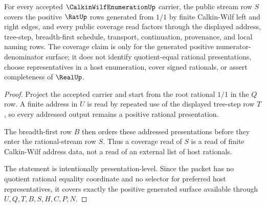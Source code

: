 \begin{theorem}
\label{thm:calkin-wilf-enumeration-positive-rational-coverage}
For every accepted $\CalkinWilfEnumerationUp$ carrier, the public stream row
$S$ covers the positive $\RatUp$ rows generated from $1/1$ by finite
Calkin-Wilf left and right edges, and every public coverage read factors
through the displayed address, tree-step, breadth-first schedule, transport,
continuation, provenance, and local naming rows. The coverage claim is only
for the generated positive numerator-denominator surface; it does not identify
quotient-equal rational presentations, choose representatives in a host
enumeration, cover signed rationals, or assert completeness of $\RealUp$.
\end{theorem}
\begin{proof}
Project the accepted carrier and start from the root rational $1/1$ in the
$Q$ row. A finite address in $U$ is read by repeated use of the displayed
tree-step row $T$, so every addressed output remains a positive rational
presentation.

The breadth-first row $B$ then orders these addressed presentations before
they enter the rational-stream row $S$. Thus a coverage read of $S$ is a read
of finite Calkin-Wilf address data, not a read of an external list of host
rationals.

The statement is intentionally presentation-level. Since the packet has no
quotient rational equality coordinate and no selector for preferred host
representatives, it covers exactly the positive generated surface available
through $U,Q,T,B,S,H,C,P,N$.
\end{proof}


